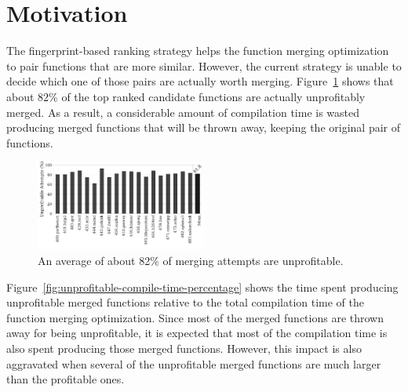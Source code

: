 \section{Motivation} \label{sec:motivation}

The fingerprint-based ranking strategy helps the function merging optimization to pair functions that are more similar.
However, the current strategy is unable to decide which one of those pairs are actually worth merging.
Figure~\ref{fig:unprofitable-attempts} shows that about 82\% of the top ranked candidate functions are actually unprofitably merged.
As a result, a considerable amount of compilation time is wasted producing merged functions that will be thrown away, keeping the original pair of functions.

\begin{figure}[h]
  \centering
  \includegraphics[width=0.5\textwidth]{figs/unprofitable-attempts.pdf}
  \vspace{-2.5em}
  \caption{An average of about 82\% of merging attempts are unprofitable.}
  \label{fig:unprofitable-attempts}
\end{figure}


Figure~\ref{fig:unprofitable-compile-time-percentage} shows the time spent producing unprofitable merged functions relative to the total compilation time of the function merging optimization.
Since most of the merged functions are thrown away for being unprofitable, it is expected that most of the compilation time is also spent producing those merged functions.
However, this impact is also aggravated when several of the unprofitable merged functions are much larger than the profitable ones.

